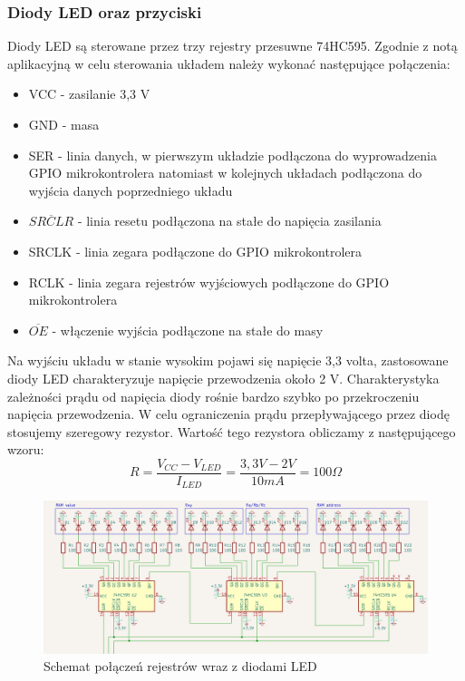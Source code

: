 \documentclass[../main.tex]{subfiles}
\begin{document}
\subsubsection{Diody LED oraz przyciski}
Diody LED są sterowane przez trzy rejestry przesuwne 74HC595. Zgodnie z notą aplikacyjną \cite{ti:74hc595}
w celu sterowania układem należy wykonać następujące połączenia:

\begin{itemize}
    \item VCC - zasilanie 3,3 V
    \item GND - masa
    \item SER - linia danych, w pierwszym układzie podłączona do wyprowadzenia GPIO mikrokontrolera natomiast w kolejnych 
    układach podłączona do wyjścia danych  poprzedniego układu
    \item $\overline{SRCLR}$ - linia resetu podłączona na stałe do napięcia zasilania
    \item SRCLK - linia zegara podłączone do GPIO mikrokontrolera
    \item RCLK - linia zegara rejestrów wyjściowych podłączone do GPIO mikrokontrolera
    \item $\overline{OE}$ - włączenie wyjścia podłączone na stałe do masy
\end{itemize}

Na wyjściu układu w stanie wysokim pojawi się napięcie 3,3 volta, zastosowane diody LED charakteryzuje napięcie przewodzenia około 2 V. Charakterystyka
zależności prądu od napięcia diody rośnie bardzo szybko po przekroczeniu napięcia przewodzenia. W celu ograniczenia prądu przepływającego przez diodę
stosujemy szeregowy rezystor. Wartość tego rezystora obliczamy z następującego wzoru: 
\begin{equation}
    R = \frac{V_{CC} - V_{LED}}{I_{LED}} = \frac{3,3 V - 2 V}{10 mA} = 100 \Omega
\end{equation}

\begin{figure}[H]
    \centering
    \includegraphics[width=\linewidth]{led_schemat.png}
    \caption{Schemat połączeń rejestrów wraz z diodami LED}
    \label{fig:led_connection}
\end{figure}
\end{document}
